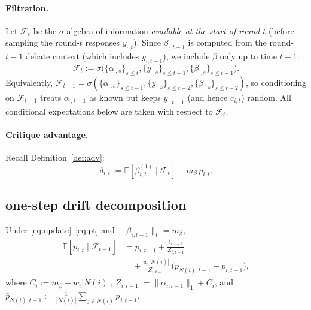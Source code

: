 \paragraph{Filtration.} \label{filtration}
Let \(\mathcal{F}_t\) be the \(\sigma\)-algebra of information \emph{available at the start of round \(t\)}
(before sampling the round-\(t\) responses \(y_{\cdot,t}\)). Since \(\beta_{\cdot,t-1}\) is computed from the
round-\(t-1\) debate context (which includes \(y_{\cdot,t-1}\)), we include \(\beta\) only up to time \(t-1\):
\[
\mathcal{F}_t := \sigma\Big(\{\alpha_{\cdot,s}\}_{s\le t},\{y_{\cdot,s}\}_{s\le t-1},\{\beta_{\cdot,s}\}_{s\le t-1}\Big).
\]
Equivalently,
\(\mathcal{F}_{t-1}=\sigma(\{\alpha_{\cdot,s}\}_{s\le t-1},\{y_{\cdot,s}\}_{s\le t-2},\{\beta_{\cdot,s}\}_{s\le t-2})\),
so conditioning on \(\mathcal{F}_{t-1}\) treats \(\alpha_{\cdot,t-1}\) as known but keeps
\(y_{\cdot,t-1}\) (and hence \(c_{i,t}\)) random.
All conditional expectations below are taken with respect to \(\mathcal{F}_t\).

\paragraph{Critique advantage.}
Recall Definition~\ref{def:adv}:
\begin{equation}
\delta_{i,t} := \mathbb{E}\!\left[\beta^{(1)}_{i,t}\mid \mathcal{F}_t\right] - m_\beta\,p_{i,t}.
\label{eq:adv_app}
\end{equation}



\subsection{one-step drift decomposition}
\label{app:proof_drift_decomp}

\begin{lemma}
\label{lem:drift_decomp}
Under \eqref{eq:update}--\eqref{eq:pt} and \(\|\beta_{i,t-1}\|_1=m_\beta\),
\begin{equation}
\begin{aligned}
\mathbb{E}\!\left[p_{i,t}\mid \mathcal{F}_{t-1}\right]
&= p_{i,t-1}
+ \frac{\delta_{i,t-1}}{Z_{i,t-1}}\\
&\quad+ \frac{w_i|N(i)|}{Z_{i,t-1}}\,\big(\bar p_{N(i),t-1}-p_{i,t-1}\big),
\end{aligned}
\label{eq:driftdecomp}
\end{equation}
where \(C_i:=m_\beta+w_i|N(i)|\), \(Z_{i,t-1}:=\|\alpha_{i,t-1}\|_1+C_i\), and
\(\bar p_{N(i),t-1}:=\frac{1}{|N(i)|}\sum_{j\in N(i)}p_{j,t-1}\).
\end{lemma}

